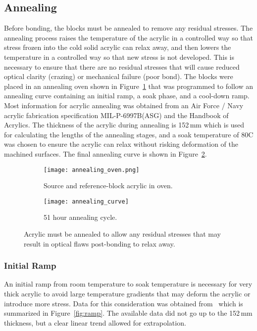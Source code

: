 \subsection{Annealing}
Before bonding, the blocks must be annealed to remove any residual stresses. The annealing process raises the temperature of the acrylic in a controlled way so that stress frozen into the cold solid acrylic can relax away, and then lowers the temperature in a controlled way so that new stress is not developed. This is necessary to ensure that there are no residual stresses that will cause reduced optical clarity (crazing) or mechanical failure (poor bond). The blocks were placed in an annealing oven shown in Figure~\ref{fig:oven} that was programmed to follow an annealing curve containing an initial ramp, a soak phase, and a cool-down ramp. Most information for acrylic annealing was obtained from an Air Force / Navy acrylic fabrication specification MIL-P-6997B(ASG) and the Handbook of Acrylics. The thickness of the acrylic during annealing is 152\,mm which is used for calculating the lengths of the annealing stages, and a soak temperature of 80\degree C was chosen to ensure the acrylic can relax without risking deformation of the machined surfaces. The final annealing curve is shown in Figure~\ref{fig:annealing}.

\begin{figure}
\begin{subfigure}{.54\textwidth}
  \texttt{[image: annealing\_oven.png]}
  \caption{Source and reference-block acrylic in oven.}
  \label{fig:oven}
\end{subfigure}
\begin{subfigure}{.47\textwidth}
  \texttt{[image: annealing\_curve]}
  \caption{51 hour annealing cycle.}
  \label{fig:annealing}
\end{subfigure}
\caption{Acrylic must be annealed to allow any residual stresses that may result in optical flaws post-bonding to relax away.}
\label{fig:annealfig}
\end{figure}

\subsubsection{Initial Ramp}
An initial ramp from room temperature to soak temperature is necessary for very thick acrylic to avoid large temperature gradients that may deform the acrylic or introduce more stress. Data for this consideration was obtained from~\cite{anneal} which is summarized in Figure~\ref{fig:ramp}. The available data did not go up to the 152\,mm thickness, but a clear linear trend allowed for extrapolation.

